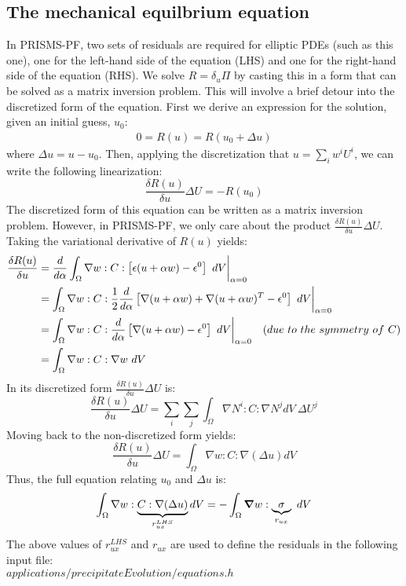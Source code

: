 \documentclass[11pt]{article}
\newcommand{\gv}[1]{\ensuremath{\mbox{\boldmath$ #1 $}}}
\newcommand{\grad}[1]{\gv{\nabla} #1} %
\renewcommand{\=}[1]{\stackrel{#1}{=}} %
\theoremstyle{definition}
\theoremstyle{remark}
\begin{document}
\subsection{The mechanical equilbrium equation}
In PRISMS-PF, two sets of residuals are required for elliptic PDEs (such as this one), one for the left-hand side of the equation (LHS) and one for the right-hand side of the equation (RHS). We solve $R=\delta_u \Pi$ by casting this in a form that can be solved as a matrix inversion problem. This will involve a brief detour into the discretized form of the equation. First we derive an expression for the solution, given an initial guess, $u_0$:
\begin{gather}
0 = R(u) = R(u_0 + \Delta u)
\end{gather}
where $\Delta u = u - u_0$. Then, applying the discretization that $u = \sum_i w^i U^i$, we can write the following linearization:
\begin{equation}
\frac{\delta R(u)}{\delta u} \Delta U = -R(u_0) \label{matrix_eqn}
\end{equation}
The discretized form of this equation can be written as a matrix inversion problem. However, in PRISMS-PF, we only care about the product $\frac{\delta R(u)}{\delta u} \Delta U$. Taking the variational derivative of $R(u)$ yields:
\begin{align}
\frac{\delta R(u)}{\delta u} &= \frac{d}{d\alpha} \int_{\Omega}   \nabla w :C: \left[ \epsilon (u+\alpha w) - \epsilon^0 \right] ~dV  \bigg{|}_{\alpha=0} \\
&=  \int_{\Omega}   \nabla w :C: \frac{1}{2}\frac{d}{d\alpha}\left[ \nabla(u+\alpha w) + \nabla(u+\alpha w)^T  - \epsilon^0\right] ~dV \bigg{|}_{\alpha=0}\\
&= \int_{\Omega}   \nabla w :C: \frac{d}{d\alpha} \left[ \nabla(u+\alpha w) - \epsilon^0 \right]  ~dV \bigg{|}_{\alpha=0} \quad (due ~to ~the ~symmetry ~of ~C) \\
&= \int_{\Omega}   \nabla w :C: \nabla w  ~dV 
\end{align}
In its discretized form $\frac{\delta R(u)}{\delta u} \Delta U$ is:
\begin{equation}
\frac{\delta R(u)}{\delta u} \Delta U = \sum_i \sum_j \int_{\Omega} \nabla N^i : C : \nabla N^j dV ~\Delta U^j
\end{equation}
Moving back to the non-discretized form yields:
\begin{equation}
\frac{\delta R(u)}{\delta u} \Delta U = \int_{\Omega} \nabla w : C : \nabla (\Delta u) dV
\end{equation}
Thus, the full equation relating $u_0$ and $\Delta u$ is:
\begin{equation}
\int_{\Omega} \nabla w : \underbrace{C : \nabla (\Delta u)}_{r_{ux}^{LHS}} dV = -\int_{\Omega}   \grad w : \underbrace{\sigma}_{r_{ux}} ~dV
\end{equation}
The above values of $r_{ux}^{LHS}$ and $r_{ux}$ are used to define the residuals in the following input file: \\
$applications/precipitateEvolution/equations.h$
\end{document}
